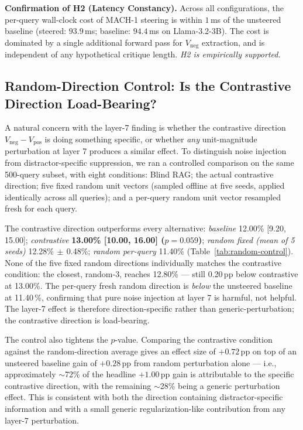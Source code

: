 \documentclass[conference]{IEEEtran}
\begin{document}
\textbf{Confirmation of H2 (Latency Constancy).} Across all configurations, the per-query wall-clock cost of MACH-1 steering is within $1$\,ms of the unsteered baseline (steered: $93.9$\,ms; baseline: $94.4$\,ms on Llama-3.2-3B). The cost is dominated by a single additional forward pass for $V_{\text{neg}}$ extraction, and is independent of any hypothetical critique length. \emph{H2 is empirically supported.}

\subsection{Random-Direction Control: Is the Contrastive Direction Load-Bearing?}\label{sec:results-random-control}

A natural concern with the layer-7 finding is whether the contrastive direction $V_{\text{neg}} - V_{\text{pos}}$ is doing something specific, or whether \emph{any} unit-magnitude perturbation at layer 7 produces a similar effect. To distinguish noise injection from distractor-specific suppression, we ran a controlled comparison on the same 500-query subset, with eight conditions: Blind RAG; the actual contrastive direction; five fixed random unit vectors (sampled offline at five seeds, applied identically across all queries); and a per-query random unit vector resampled fresh for each query.



The contrastive direction outperforms every alternative: \emph{baseline} 12.00\% [9.20, 15.00]; \emph{contrastive} \textbf{13.00\% [10.00, 16.00] ($p\!=\!0.059$)}; \emph{random fixed (mean of 5 seeds)} 12.28\%$\,\pm\,$0.48\%; \emph{random per-query} 11.40\% (Table~\ref{tab:random-control}). None of the five fixed random directions individually matches the contrastive condition: the closest, random-3, reaches 12.80\% --- still 0.20\,pp below contrastive at 13.00\%. The per-query fresh random direction is \emph{below} the unsteered baseline at 11.40\,\%, confirming that pure noise injection at layer 7 is harmful, not helpful. The layer-7 effect is therefore direction-specific rather than generic-perturbation; the contrastive direction is load-bearing.

The control also tightens the $p$-value. Comparing the contrastive condition against the random-direction average gives an effect size of $+0.72$\,pp on top of an unsteered baseline gain of $+0.28$\,pp from random perturbation alone --- i.e., approximately $\sim$72\% of the headline $+1.00$\,pp gain is attributable to the specific contrastive direction, with the remaining $\sim$28\% being a generic perturbation effect. This is consistent with both the direction containing distractor-specific information and with a small generic regularization-like contribution from any layer-7 perturbation.
\end{document}
